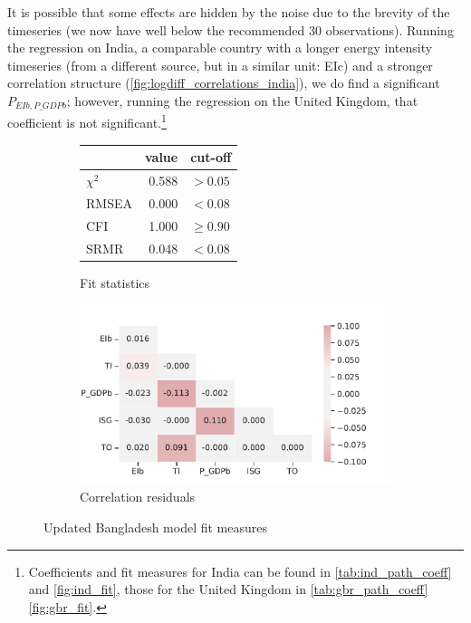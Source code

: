 \documentclass[11pt,a4paper]{article}
\begin{document}
It is possible that some effects are hidden by the noise due to the brevity of the timeseries (we now have well below the recommended 30 observations). 
Running the regression on India, a comparable country with a longer energy intensity timeseries (from a different source, but in a similar unit: EIc) and a stronger correlation structure (\cref{fig:logdiff_correlations_india}), we do find a significant $P_{EIb,P\_GDPb}$; however, running the regression on the United Kingdom, that coefficient is not significant.\footnote{
Coefficients and fit measures for India can be found in \cref{tab:ind_path_coeff} and \cref{fig:ind_fit},
those for the United Kingdom in \cref{tab:gbr_path_coeff} \cref{fig:gbr_fit}.
} 

\begin{figure}[tbp]
\begin{subfigure}{0.4\textwidth}
\centering
\begin{tabular}{lrl}
\toprule
{} &  value &      cut-off \\
\midrule
$\chi^2$ &  0.588 &     $> 0.05$ \\
RMSEA    &  0.000 &      $<0.08$ \\
CFI      &  1.000 &  $\geq 0.90$ \\
SRMR     &  0.048 &      $<0.08$ \\
\bottomrule
\end{tabular}
\caption{Fit statistics}
\label{tab:updated_fit_statistics}
\end{subfigure}
\begin{subfigure}{0.6\textwidth}
\centering
\includegraphics[width=\textwidth]{./plots/updated_correlation_residuals.pdf}
\caption{Correlation residuals}
\label{fig:updated_fit_residuals}
\end{subfigure}
\caption{Updated Bangladesh model fit measures}
\label{fig:updated_fit}
\end{figure}
\end{document}
